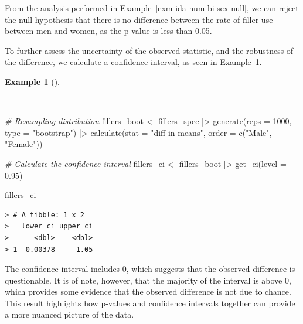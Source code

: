 \documentclass[
  letterpaper,
]{latex/krantz}
\newenvironment{Shaded}{\begin{snugshade}}{\end{snugshade}}
\newcommand{\AttributeTok}[1]{\textcolor[rgb]{0.00,0.00,0.00}{#1}}
\newcommand{\CommentTok}[1]{\textcolor[rgb]{0.00,0.00,0.00}{\textit{#1}}}
\newcommand{\DecValTok}[1]{\textcolor[rgb]{0.00,0.00,0.00}{#1}}
\newcommand{\FloatTok}[1]{\textcolor[rgb]{0.00,0.00,0.00}{#1}}
\newcommand{\FunctionTok}[1]{\textcolor[rgb]{0.00,0.00,0.00}{#1}}
\newcommand{\NormalTok}[1]{\textcolor[rgb]{0.00,0.00,0.00}{#1}}
\newcommand{\OtherTok}[1]{\textcolor[rgb]{0.00,0.00,0.00}{#1}}
\newcommand{\SpecialCharTok}[1]{\textcolor[rgb]{0.00,0.00,0.00}{#1}}
\newcommand{\StringTok}[1]{\textcolor[rgb]{0.00,0.00,0.00}{#1}}
\theoremstyle{definition}
\newtheorem{example}{Example}[chapter]
\theoremstyle{remark}
\begin{document}
From the analysis performed in Example~\ref{exm-ida-num-bi-sex-null}, we
can reject the null hypothesis that there is no difference between the
rate of filler use between men and women, as the p-value is less than
0.05.

To further assess the uncertainty of the observed statistic, and the
robustness of the difference, we calculate a confidence interval, as
seen in Example~\ref{exm-ida-num-bi-sex-ci}.

\begin{example}[]\protect\hypertarget{exm-ida-num-bi-sex-ci}{}\label{exm-ida-num-bi-sex-ci}

~

\begin{Shaded}
\begin{Highlighting}[]
\CommentTok{\# Resampling distribution}
\NormalTok{fillers\_boot }\OtherTok{\textless{}{-}}
\NormalTok{  fillers\_spec }\SpecialCharTok{|\textgreater{}}
  \FunctionTok{generate}\NormalTok{(}\AttributeTok{reps =} \DecValTok{1000}\NormalTok{, }\AttributeTok{type =} \StringTok{"bootstrap"}\NormalTok{) }\SpecialCharTok{|\textgreater{}}
  \FunctionTok{calculate}\NormalTok{(}\AttributeTok{stat =} \StringTok{"diff in means"}\NormalTok{, }\AttributeTok{order =} \FunctionTok{c}\NormalTok{(}\StringTok{"Male"}\NormalTok{, }\StringTok{"Female"}\NormalTok{))}

\CommentTok{\# Calculate the confidence interval}
\NormalTok{fillers\_ci }\OtherTok{\textless{}{-}}
\NormalTok{  fillers\_boot }\SpecialCharTok{|\textgreater{}}
  \FunctionTok{get\_ci}\NormalTok{(}\AttributeTok{level =} \FloatTok{0.95}\NormalTok{)}

\NormalTok{fillers\_ci}
\end{Highlighting}
\end{Shaded}

\begin{verbatim}
> # A tibble: 1 x 2
>   lower_ci upper_ci
>      <dbl>    <dbl>
> 1 -0.00378     1.05
\end{verbatim}

\end{example}

The confidence interval includes 0, which suggests that the observed
difference is questionable. It is of note, however, that the majority of
the interval is above 0, which provides some evidence that the observed
difference is not due to chance. This result highlights how p-values and
confidence intervals together can provide a more nuanced picture of the
data.
\end{document}

